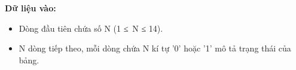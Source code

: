 \textbf{    Dữ liệu vào:   }
\begin{itemize}
	\item     Dòng đầu tiên chứa số N (1 ≤ N ≤ 14).   
	\item     N dòng tiếp theo, mỗi dòng chứa N kí tự '0' hoặc '1' mô tả trạng thái của bảng.   
\end{itemize}